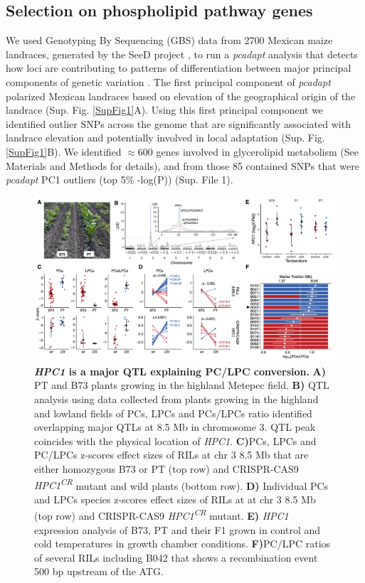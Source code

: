 \documentclass[9pt,twocolumn,twoside,lineno]{BioRxiv}
\begin{document}
\subsection{Selection on phospholipid pathway genes} 
We used Genotyping By Sequencing (GBS) data from 2700 Mexican maize landraces, generated by the SeeD project \cite{Romero_Navarro2017-cn, Gates2019-xu}, to run a \textit{pcadapt} analysis that detects how loci are contributing to patterns of differentiation between major principal components of genetic variation \cite{Luu2017-ws}.
The first principal component of \textit{pcadapt} polarized Mexican landraces based on elevation of the geographical origin of the landrace (Sup. Fig. \ref{SupFig1}A).
Using this first principal component we identified outlier SNPs across the genome that are significantly associated with landrace elevation and potentially involved in local adaptation (Sup. Fig. \ref{SupFig1}B).
We identified $\approx 600$ genes involved in glycerolipid metabolism (See Materials and Methods for details), and from those 85 contained SNPs that were \textit{pcadapt} PC1 outliers (top 5\% -log(P)) (Sup. File 1).
\begin{figure}[!ht]
\begin{center}
\includegraphics[width=0.8\paperwidth]{Figures/Fig_3.png}
\caption{\textbf{\textit{HPC1} is a major QTL explaining PC/LPC conversion.} 
\textbf{A)} PT and B73 plants growing in the highland Metepec field. 
\textbf{B)} QTL analysis using data collected from plants growing in the highland and lowland fields of PCs, LPCs and PCs/LPCs ratio identified overlapping major QTLs at 8.5 Mb in chromosome 3. 
QTL peak coincides with the physical location of \textit{HPC1}. 
\textbf{C)}PCs, LPCs and PC/LPCs z-scores effect sizes of RILs at chr 3 8.5 Mb that are either homozygous B73 or PT (top row) and CRISPR-CAS9 \textit{HPC1\textsuperscript{CR}} mutant and wild plants (bottom row).        
\textbf{D)} Individual PCs and LPCs species z-scores effect sizes of RILs at at chr 3 8.5 Mb (top row) and CRISPR-CAS9 \textit{HPC1\textsuperscript{CR}} mutant.
\textbf{E)} \textit{HPC1} expression analysis of B73, PT and their F1 grown in control and cold temperatures in growth chamber conditions.
\textbf{F)}PC/LPC ratios of several RILs including B042 that shows a recombination event 500 bp upstream of the ATG.}
\label{Fig3}
\end{center}
\end{figure} 
\end{document}
